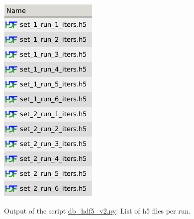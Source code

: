 \documentclass[10pt,a4paper]{article}
\begin{document}
\begin{figure}[htb!]
\centering\leavevmode
\graphicspath{{./hdf5_snapshots/}}
%
\centering\leavevmode
\includegraphics[scale=.4]{Fig_0_list_of_separate_hdf5_files.png} 
\label{Fig: h5 per run list}
\caption{\footnotesize Output of the script \url{db_hdf5_v2.py}: List of h5 files per run.}
\end{figure}
\end{document}
